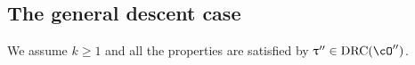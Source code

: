 \documentclass[12pt,a4paper]{amsart}
\def\eDD{\overline{\nabla}}
\numberwithin{equation}{section}
\theoremstyle{remark}
\def\drc{\mathrm{DRC}}
\def\cOpp{\cO^{\prime\prime}}
\def\uptaupp{\uptau^{\prime\prime}}
\begin{document}



\subsection{The general descent case}
We  assume $k\geq 1$ and all the properties are satisfied by $\uptaupp\in \drc(\cOpp)$.
\end{document}
